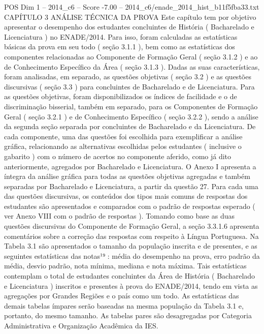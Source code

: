 \begin{textsample}{POS Dim 1 – 2014\_c6 – Score -7.00 – 2014\_c6/enade\_2014\_hist\_b11f5fba33.txt}  \label{ex:f1_pos_423}
CAPÍTULO 3 ANÁLISE TÉCNICA DA PROVA Este capítulo tem por objetivo apresentar o desempenho dos estudantes concluintes de História ( Bacharelado e Licenciatura ) no ENADE/2014.
Para isso, foram calculadas as estatísticas básicas da prova em seu todo ( seção 3.1.1 ), bem como as estatísticas dos componentes relacionadas ao Componente de Formação Geral ( seção 3.1.2 ) e ao de Conhecimento Específico da Área ( seção 3.1.3 ).
Dadas as suas características, foram analisadas, em separado, as questões objetivas ( seção 3.2 ) e as questões discursivas ( seção 3.3 ) para concluintes de Bacharelado e de Licenciatura.
Para as questões objetivas, foram disponibilizados os índices de facilidade e o de discriminação bisserial, também em separado, para os Componentes de Formação Geral ( seção 3.2.1 ) e de Conhecimento Específico ( seção 3.2.2 ), sendo a análise da segunda seção separada por concluintes de Bacharelado e da Licenciatura.
De cada componente, uma das questões foi escolhida para exemplificar a análise gráfica, relacionando as alternativas escolhidas pelos estudantes ( inclusive o gabarito ) com o número de acertos no componente aferido, como já dito anteriormente, agregados por Bacharelado e Licenciatura.
O Anexo I apresenta a íntegra da análise gráfica para todas as questões objetivas agregadas e também separadas por Bacharelado e Licenciatura, a partir da questão 27.
Para cada uma das questões discursivas, os conteúdos dos tipos mais comuns de respostas dos estudantes são apresentados e comparados com o padrão de respostas esperado ( ver Anexo VIII com o padrão de respostas ).
Tomando como base as duas questões discursivas do Componente de Formação Geral, a seção 3.3.1.6 apresenta comentários sobre a correção das respostas com respeito à Língua Portuguesa.
Na Tabela 3.1 são apresentados o tamanho da população inscrita e de presentes, e as seguintes estatísticas das notas¹⁹ : média do desempenho na prova, erro padrão da média, desvio padrão, nota mínima, mediana e nota máxima.
Tais estatísticas contemplam o total de estudantes concluintes da Área de História ( Bacharelado e Licenciatura ) inscritos e presentes à prova do ENADE/2014, tendo em vista as agregações por Grandes Regiões e o país como um todo.
As estatísticas das demais tabelas ímpares serão baseadas na mesma população da Tabela 3.1 e, portanto, do mesmo tamanho.
As tabelas pares são desagregadas por Categoria Administrativa e Organização Acadêmica da IES.

\end{textsample}
